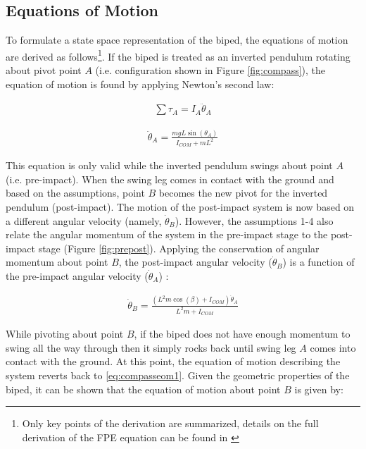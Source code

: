\subsection{Equations of Motion}

To formulate a state space representation of the biped, the equations of motion are derived as follows\footnote{Only key points of the derivation are summarized, details on the full derivation of the FPE equation can be found in \cite{Wight:2008vt,Millard:2011vk}}. If the biped is treated as an inverted pendulum rotating about pivot point $A$ (i.e. configuration shown in Figure  \ref{fig:compass}), the equation of motion is found by applying Newton's second law:

\begin{equation}
	\begin{aligned}
		\sum {{\tau _A} = {I_A}} {{\ddot \theta }_A}
	\end{aligned}
\end{equation}

\begin{equation} \label{eq:compasseom1}
	\begin{aligned}
		{{\ddot \theta }_A} = \frac{{mgL\sin ({\theta _A})}}{{{I_{COM}} + m{L^2}}}
	\end{aligned}
\end{equation}

This equation is only valid while the inverted pendulum swings about point $A$ (i.e. pre-impact). When the swing leg comes in contact with the ground and based on the assumptions, point $B$ becomes the new pivot for the inverted pendulum (post-impact). The motion of the post-impact system is now based on a different angular velocity (namely, $\dot{\theta}_B$). However, the assumptions 1-4 also relate the angular momentum of the system in the pre-impact stage to the post-impact stage (Figure \ref{fig:prepost}). Applying the conservation of angular momentum about point $B$, the post-impact angular velocity ($\dot{\theta}_B$) is a function of the pre-impact angular velocity ($\dot{\theta}_A$) \cite{Wight:2008vt}: 

\begin{equation}
	\begin{aligned}
		{\dot \theta _B} = \frac{{({L^2}m\cos (\beta ) + {I_{COM}}){{\dot \theta }_A}}}{{{L^2}m + {I_{COM}}}}
	\end{aligned}
\end{equation}

While pivoting about point $B$, if the biped does not have enough momentum to swing all the way through then it simply rocks back until swing leg $A$ comes into contact with the ground. At this point, the equation of motion describing the system reverts back to \eqref{eq:compasseom1}. Given the geometric properties of the biped, it can be shown that the equation of motion about point $B$ is given by: 

